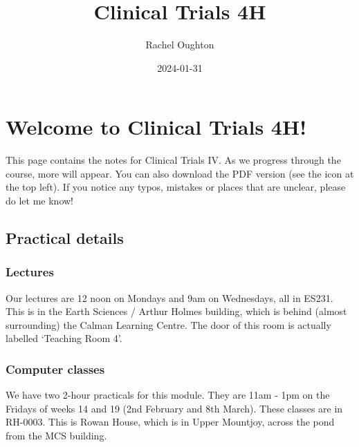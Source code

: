 \documentclass[
  openany]{book}
\title{Clinical Trials 4H}
\author{Rachel Oughton}
\date{2024-01-31}
\theoremstyle{definition}
\theoremstyle{definition}
\theoremstyle{definition}
\theoremstyle{definition}
\theoremstyle{remark}
\begin{document}
\maketitle

{
\setcounter{tocdepth}{1}
\tableofcontents
}
\hypertarget{welcome-to-clinical-trials-4h}{%
\chapter*{Welcome to Clinical Trials 4H!}\label{welcome-to-clinical-trials-4h}}

This page contains the notes for Clinical Trials IV. As we progress through the course, more will appear. You can also download the PDF version (see the icon at the top left). If you notice any typos, mistakes or places that are unclear, please do let me know!

\hypertarget{practical-details}{%
\section*{Practical details}\label{practical-details}}

\hypertarget{lectures}{%
\subsection*{Lectures}\label{lectures}}

Our lectures are 12 noon on Mondays and 9am on Wednesdays, all in ES231. This is in the Earth Sciences / Arthur Holmes building, which is behind (almost surrounding) the Calman Learning Centre. The door of this room is actually labelled `Teaching Room 4'.

\hypertarget{computer-classes}{%
\subsection*{Computer classes}\label{computer-classes}}

We have two 2-hour practicals for this module. They are 11am - 1pm on the Fridays of weeks 14 and 19 (2nd February and 8th March). These classes are in RH-0003. This is Rowan House, which is in Upper Mountjoy, across the pond from the MCS building.
\end{document}
